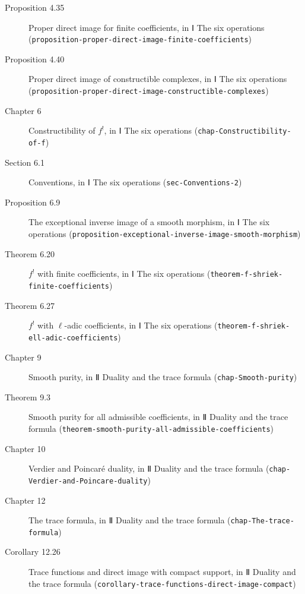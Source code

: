 \documentclass[11pt]{article}
\newcommand{\bpslug}[1]{\texttt{#1}}
\begin{document}
\begin{description}
\item[Proposition 4.35] Proper direct image for finite coefficients, in Ⅰ The six operations (\bpslug{proposition-{}\allowbreak{}proper-{}\allowbreak{}direct-{}\allowbreak{}image-{}\allowbreak{}finite-{}\allowbreak{}coefficients})
\item[Proposition 4.40] Proper direct image of constructible complexes, in Ⅰ The six operations (\bpslug{proposition-{}\allowbreak{}proper-{}\allowbreak{}direct-{}\allowbreak{}image-{}\allowbreak{}constructible-{}\allowbreak{}complexes})
\item[Chapter 6] Constructibility of $f^!$, in Ⅰ The six operations (\bpslug{chap-{}\allowbreak{}Constructibility-{}\allowbreak{}of-{}\allowbreak{}f})
\item[Section 6.1] Conventions, in Ⅰ The six operations (\bpslug{sec-{}\allowbreak{}Conventions-{}\allowbreak{}2})
\item[Proposition 6.9] The exceptional inverse image of a smooth morphism, in Ⅰ The six operations (\bpslug{proposition-{}\allowbreak{}exceptional-{}\allowbreak{}inverse-{}\allowbreak{}image-{}\allowbreak{}smooth-{}\allowbreak{}morphism})
\item[Theorem 6.20] $f^!$ with finite coefficients, in Ⅰ The six operations (\bpslug{theorem-{}\allowbreak{}f-{}\allowbreak{}shriek-{}\allowbreak{}finite-{}\allowbreak{}coefficients})
\item[Theorem 6.27] $f^!$ with $\ell$-adic coefficients, in Ⅰ The six operations (\bpslug{theorem-{}\allowbreak{}f-{}\allowbreak{}shriek-{}\allowbreak{}ell-{}\allowbreak{}adic-{}\allowbreak{}coefficients})
\item[Chapter 9] Smooth purity, in Ⅱ Duality and the trace formula (\bpslug{chap-{}\allowbreak{}Smooth-{}\allowbreak{}purity})
\item[Theorem 9.3] Smooth purity for all admissible coefficients, in Ⅱ Duality and the trace formula (\bpslug{theorem-{}\allowbreak{}smooth-{}\allowbreak{}purity-{}\allowbreak{}all-{}\allowbreak{}admissible-{}\allowbreak{}coefficients})
\item[Chapter 10] Verdier and Poincaré duality, in Ⅱ Duality and the trace formula (\bpslug{chap-{}\allowbreak{}Verdier-{}\allowbreak{}and-{}\allowbreak{}Poincare-{}\allowbreak{}duality})
\item[Chapter 12] The trace formula, in Ⅱ Duality and the trace formula (\bpslug{chap-{}\allowbreak{}The-{}\allowbreak{}trace-{}\allowbreak{}formula})
\item[Corollary 12.26] Trace functions and direct image with compact support, in Ⅱ Duality and the trace formula (\bpslug{corollary-{}\allowbreak{}trace-{}\allowbreak{}functions-{}\allowbreak{}direct-{}\allowbreak{}image-{}\allowbreak{}compact})

\end{description}
\end{document}
